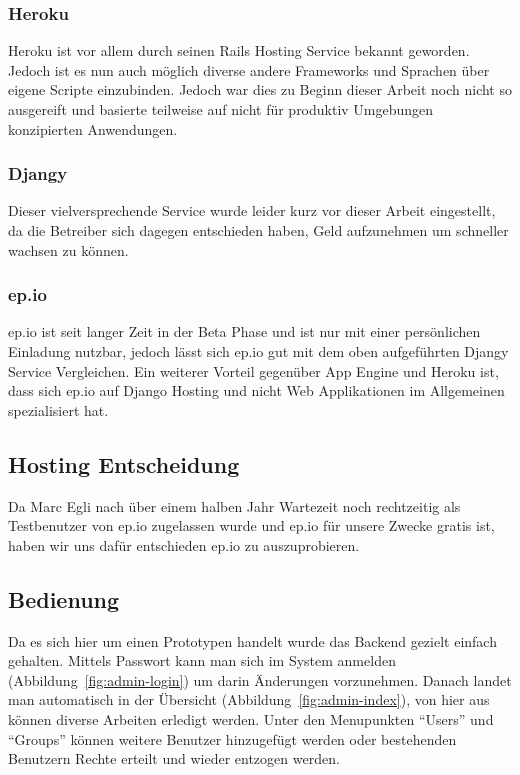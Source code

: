 \subsubsection{Heroku} %
\label{ssub:Heroku}
Heroku ist vor allem durch seinen Rails Hosting Service bekannt geworden. Jedoch ist es nun auch möglich diverse andere Frameworks und Sprachen über eigene Scripte einzubinden. Jedoch war dies zu Beginn dieser Arbeit noch nicht so ausgereift und basierte teilweise auf nicht für produktiv Umgebungen konzipierten Anwendungen.

\subsubsection{Djangy} %
\label{ssub:Djangy}
Dieser vielversprechende Service wurde leider kurz vor dieser Arbeit eingestellt, da die Betreiber sich dagegen entschieden haben, Geld aufzunehmen um schneller wachsen zu können.

\subsubsection{ep.io} %
\label{ssub:ep.io}
ep.io ist seit langer Zeit in der Beta Phase und ist nur mit einer persönlichen Einladung nutzbar, jedoch lässt sich ep.io gut mit dem oben aufgeführten Djangy Service Vergleichen. Ein weiterer Vorteil gegenüber App Engine und Heroku ist, dass sich ep.io auf Django Hosting und nicht Web Applikationen im Allgemeinen spezialisiert hat.


\subsection{Hosting Entscheidung} %
\label{sub:Hosting Entscheidung}
Da Marc Egli nach über einem halben Jahr Wartezeit noch rechtzeitig als Testbenutzer von ep.io zugelassen wurde und ep.io für unsere Zwecke gratis ist, haben wir uns dafür entschieden ep.io zu auszuprobieren.

\subsection{Bedienung} %
\label{sub:Bedienung}
Da es sich hier um einen Prototypen handelt wurde das Backend gezielt einfach gehalten. Mittels Passwort kann man sich im System anmelden (Abbildung~\ref{fig:admin-login}) um darin Änderungen vorzunehmen. Danach landet man automatisch in der Übersicht (Abbildung~\ref{fig:admin-index}), von hier aus können diverse Arbeiten erledigt werden. Unter den Menupunkten "`Users"' und "`Groups"' können weitere Benutzer hinzugefügt werden oder bestehenden Benutzern Rechte erteilt und wieder entzogen werden.

